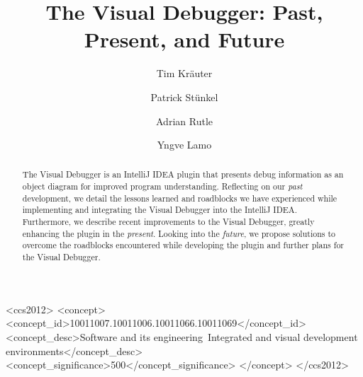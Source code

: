 \documentclass[sigconf]{acmart}
\begin{document}
\title{The Visual Debugger: Past, Present, and Future}

\author{Tim Kr\"{a}uter}

\author{Patrick Stünkel}

\author{Adrian Rutle}

\author{Yngve Lamo}

\renewcommand{\shortauthors}{Kräuter et al.}
\newcommand{\intellij}{IntelliJ IDEA}

\begin{abstract}
    The Visual Debugger is an IntelliJ IDEA plugin that presents debug information as an object diagram for improved program understanding.
    Reflecting on our \textit{past} development, we detail the lessons learned and roadblocks we have experienced while implementing and integrating the Visual Debugger into the IntelliJ IDEA.
    Furthermore, we describe recent improvements to the Visual Debugger, greatly enhancing the plugin in the \textit{present}.
    Looking into the \textit{future}, we propose solutions to overcome the roadblocks encountered while developing the plugin and further plans for the Visual Debugger.
\end{abstract}

\begin{CCSXML}
<ccs2012>
   <concept>
       <concept_id>10011007.10011006.10011066.10011069</concept_id>
       <concept_desc>Software and its engineering~Integrated and visual development environments</concept_desc>
       <concept_significance>500</concept_significance>
       </concept>
 </ccs2012>
\end{CCSXML}

\end{document}

